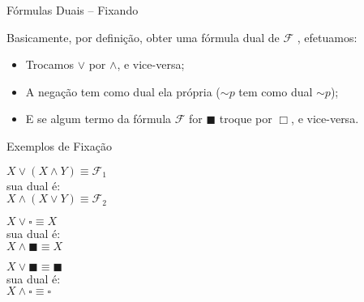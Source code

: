 \begin{frame}[t]{Fórmulas Duais -- Fixando}

Basicamente, por definição, obter uma fórmula dual de $\mathcal{F}$ , efetuamos:
\begin{itemize}
  \item Trocamos $\vee $ por $\wedge $,  e vice-versa;
  \item A negação tem como  dual ela própria ($\sim p$ tem como dual $\sim p$);
  \item E se algum termo da fórmula $\mathcal{F}$ for $\blacksquare $ troque por $\Box $,  e vice-versa.
\end{itemize}

\end{frame}

\begin{frame}[fragile]{Exemplos de Fixação}

\begin{description}
\itemsep 13pt

\item[Ex1:] $ X \vee (X \wedge Y) \equiv \mathcal{F}_1 $\\
sua dual é:\\
 $ X \wedge (X \vee Y) \equiv \mathcal{F}_2 $

\item[Ex2:] $ X \vee  \square  \equiv X $\\
sua dual é:\\
 $ X \wedge \blacksquare \equiv X $

 \item[Ex3:] $ X \vee \blacksquare  \equiv \blacksquare $ \\
 sua dual é:\\
 $ X \wedge \square \equiv \square $
\end{description}

\end{frame}


